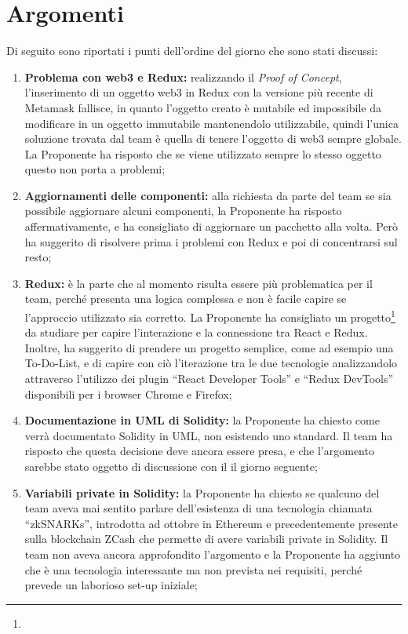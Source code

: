 \documentclass[VER-2018-01-09.tex]{subfiles}
\begin{document}
\section{Argomenti}
Di seguito sono riportati i punti dell'ordine del giorno che sono stati discussi:
\begin{enumerate}
	\item \textbf{Problema con web3 e Redux:} realizzando il \textit{Proof of Concept}, l'inserimento di un oggetto web3 in Redux con la versione più recente di Metamask fallisce, in quanto l'oggetto creato è mutabile ed impossibile da modificare in un oggetto immutabile mantenendolo utilizzabile, quindi l'unica soluzione trovata dal team è quella di tenere l'oggetto di web3 sempre globale. La Proponente ha risposto che se viene utilizzato sempre lo stesso oggetto questo non porta a problemi;
	\item \textbf{Aggiornamenti delle componenti:} alla richiesta da parte del team se sia possibile aggiornare alcuni componenti, la Proponente ha risposto affermativamente, e ha consigliato di aggiornare un pacchetto alla volta. Però ha suggerito di risolvere prima i problemi con Redux e poi di concentrarsi sul resto;
	\item \textbf{Redux:} è la parte che al momento risulta essere più problematica per il team, perché presenta una logica complessa e non è facile capire se l'approccio utilizzato sia corretto. La Proponente ha consigliato un progetto\footnote{} da studiare per capire l'interazione e la connessione tra React e Redux. Inoltre, ha suggerito di prendere un progetto semplice, come ad esempio una To-Do-List, e di capire con ciò l'iterazione tra le due tecnologie analizzandolo attraverso l'utilizzo dei plugin \textquotedblleft{}React Developer Tools\textquotedblright{} e \textquotedblleft{}Redux DevTools\textquotedblright{} disponibili per i browser Chrome e Firefox;
	\item \textbf{Documentazione in UML di Solidity:} la Proponente ha chiesto come verrà documentato Solidity in UML, non esistendo uno standard. Il team ha risposto che questa decisione deve ancora essere presa, e che l'argomento sarebbe stato oggetto di discussione con il \Vardanega il giorno seguente;
	\item \textbf{Variabili private in Solidity:} la Proponente ha chiesto se qualcuno del team aveva mai sentito parlare dell'esistenza di una tecnologia chiamata \textquotedblleft{}zkSNARKs\textquotedblright{}, introdotta ad ottobre in Ethereum e precedentemente presente sulla blockchain ZCash che permette di avere variabili private in Solidity. Il team non aveva ancora approfondito l'argomento e la Proponente ha aggiunto che è una tecnologia interessante ma non prevista nei requisiti, perché prevede un laborioso set-up iniziale;

\end{enumerate}
\end{document}

